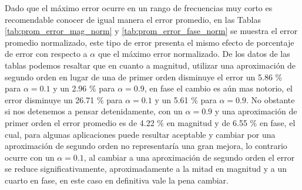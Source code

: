 	Dado que el máximo error ocurre en un rango de frecuencias muy corto es recomendable conocer de igual manera el error promedio, en las Tablas \ref{tab:prom_error_mag_norm} y \ref{tab:prom_error_fase_norm} se muestra el error promedio normalizado, este tipo de error presenta el mismo efecto de porcentaje de error con respecto a $\alpha$ que el máximo error normalizado. De los datos de las tablas podemos resaltar que en cuanto a magnitud, utilizar una aproximación de segundo orden en lugar de una de primer orden disminuye el error un 5.86 \% para $\alpha = 0.1$ y un 2.96 \% para $\alpha = 0.9$, en fase el cambio es aún mas notorio, el error disminuye un 26.71 \% para $\alpha = 0.1$ y un 5.61 \% para $\alpha = 0.9$. No obstante si nos detenemos a pensar detenidamente, con un $\alpha=0.9$ y una aproximación de primer orden el error promedio es de 4.22 \% en magnitud y de 6.55 \% en fase, el cual, para algunas aplicaciones puede resultar aceptable y cambiar por una aproximación de segundo orden no representaría una gran mejora, lo contrario ocurre con un $\alpha=0.1$, al cambiar a una aproximación de segundo orden el error se reduce significativamente, aproximadamente a la mitad en magnitud y a un cuarto en fase, en este caso en definitiva vale la pena cambiar.


